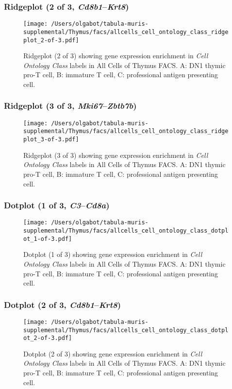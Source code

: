 \clearpage

\subsubsection{Ridgeplot (2 of 3, \emph{Cd8b1}--\emph{Krt8})}
\begin{figure}[h]
\centering
\texttt{[image: /Users/olgabot/tabula-muris-supplemental/Thymus/facs/allcells\_cell\_ontology\_class\_ridgeplot\_2-of-3.pdf]}

\caption{ Ridgeplot (2 of 3)  showing gene expression enrichment in \emph{Cell Ontology Class} labels in All Cells of Thymus FACS. A: DN1 thymic pro-T cell, B: immature T cell, C: professional antigen presenting cell.}
\end{figure}


\clearpage

\subsubsection{Ridgeplot (3 of 3, \emph{Mki67}--\emph{Zbtb7b})}
\begin{figure}[h]
\centering
\texttt{[image: /Users/olgabot/tabula-muris-supplemental/Thymus/facs/allcells\_cell\_ontology\_class\_ridgeplot\_3-of-3.pdf]}

\caption{ Ridgeplot (3 of 3)  showing gene expression enrichment in \emph{Cell Ontology Class} labels in All Cells of Thymus FACS. A: DN1 thymic pro-T cell, B: immature T cell, C: professional antigen presenting cell.}
\end{figure}


\clearpage

\subsubsection{Dotplot (1 of 3, \emph{C3}--\emph{Cd8a})}
\begin{figure}[h]
\centering
\texttt{[image: /Users/olgabot/tabula-muris-supplemental/Thymus/facs/allcells\_cell\_ontology\_class\_dotplot\_1-of-3.pdf]}

\caption{ Dotplot (1 of 3)  showing gene expression enrichment in \emph{Cell Ontology Class} labels in All Cells of Thymus FACS. A: DN1 thymic pro-T cell, B: immature T cell, C: professional antigen presenting cell.}
\end{figure}


\clearpage

\subsubsection{Dotplot (2 of 3, \emph{Cd8b1}--\emph{Krt8})}
\begin{figure}[h]
\centering
\texttt{[image: /Users/olgabot/tabula-muris-supplemental/Thymus/facs/allcells\_cell\_ontology\_class\_dotplot\_2-of-3.pdf]}

\caption{ Dotplot (2 of 3)  showing gene expression enrichment in \emph{Cell Ontology Class} labels in All Cells of Thymus FACS. A: DN1 thymic pro-T cell, B: immature T cell, C: professional antigen presenting cell.}
\end{figure}


